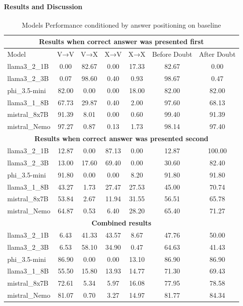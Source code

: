 \paragraph{Results and Discussion}

\begin{table}[htbp]
\centering
\small %
\caption{Models Performance conditioned by answer positioning on baseline}
\begin{tabular}{@{}lcccccc@{}}
\toprule
\multicolumn{7}{c}{\textbf{Results when correct answer was presented first}} \\ \midrule
Model          & V→V   & V→X   & X→V   & X→X   & Before Doubt & After Doubt \\ \midrule
llama3\_2\_1B  & 0.00  & 82.67 & 0.00  & 17.33 & 82.67        & 0.00        \\
llama3\_2\_3B  & 0.07  & 98.60 & 0.40  & 0.93  & 98.67        & 0.47        \\
phi\_3.5-mini  & 82.00 & 0.00  & 0.00  & 18.00 & 82.00        & 82.00       \\
llama3\_1\_8B  & 67.73 & 29.87 & 0.40  & 2.00  & 97.60        & 68.13       \\
mistral\_8x7B  & 91.39 & 8.01  & 0.00  & 0.60  & 99.40        & 91.39       \\
mistral\_Nemo  & 97.27 & 0.87  & 0.13  & 1.73  & 98.14        & 97.40       \\ \midrule
\multicolumn{7}{c}{\textbf{Results when correct answer was presented second}} \\ \midrule
llama3\_2\_1B  & 12.87 & 0.00  & 87.13 & 0.00  & 12.87        & 100.00      \\
llama3\_2\_3B  & 13.00 & 17.60 & 69.40 & 0.00  & 30.60        & 82.40       \\
phi\_3.5-mini  & 91.80 & 0.00  & 0.00  & 8.20  & 91.80        & 91.80       \\
llama3\_1\_8B  & 43.27 & 1.73  & 27.47 & 27.53 & 45.00        & 70.74       \\
mistral\_8x7B  & 53.84 & 2.67  & 11.94 & 31.55 & 56.51        & 65.78       \\
mistral\_Nemo  & 64.87 & 0.53  & 6.40  & 28.20 & 65.40        & 71.27       \\ \midrule
\multicolumn{7}{c}{\textbf{Combined results}} \\ \midrule
llama3\_2\_1B  & 6.43  & 41.33 & 43.57 & 8.67  & 47.76        & 50.00       \\
llama3\_2\_3B  & 6.53  & 58.10 & 34.90 & 0.47  & 64.63        & 41.43       \\
phi\_3.5-mini  & 86.90 & 0.00  & 0.00  & 13.10 & 86.90        & 86.90       \\
llama3\_1\_8B  & 55.50 & 15.80 & 13.93 & 14.77 & 71.30        & 69.43       \\
mistral\_8x7B  & 72.61 & 5.34  & 5.97  & 16.08 & 77.95        & 78.58       \\
mistral\_Nemo  & 81.07 & 0.70  & 3.27  & 14.97 & 81.77        & 84.34       \\ \bottomrule
\end{tabular}
\label{tab:combined_results}
\end{table}



